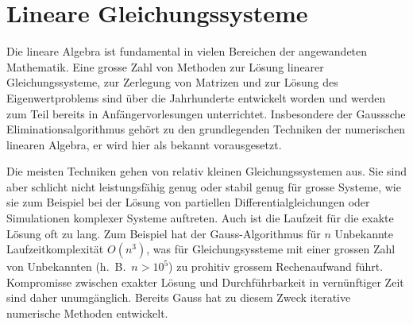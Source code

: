 %
%
%
\chapter{Lineare Gleichungssysteme\label{chapter:linsys}}
\rhead{}
Die lineare Algebra ist fundamental in vielen Bereichen der angewandeten
Mathematik.
%
Eine grosse Zahl von Methoden zur Lösung linearer
Gleichungssysteme, zur Zerlegung von Matrizen und zur Lösung des
%
%
Eigenwertproblems sind über die Jahrhunderte entwickelt worden und
werden zum Teil bereits in Anfängervorlesungen unterrichtet.
Insbesondere der Gausssche Eliminationsalgorithmus gehört zu den
grundlegenden Techniken der numerischen linearen Algebra, er wird hier
als bekannt vorausgesetzt.

Die meisten Techniken gehen von relativ kleinen Gleichungssystemen aus.
Sie sind aber schlicht nicht leistungsfähig genug oder stabil genug für 
grosse Systeme, wie sie zum Beispiel bei der Lösung von partiellen
Differentialgleichungen oder Simulationen komplexer Systeme auftreten.
Auch ist die Laufzeit für die exakte Lösung oft zu lang.
%
%
Zum Beispiel hat der Gauss-Algorithmus für $n$ Unbekannte Laufzeitkomplexität
$O(n^3)$, was für Gleichungsyssteme mit einer grossen Zahl von Unbekannten
(h.~B.~$n>10^5$) zu prohitiv grossem Rechenaufwand führt.
%
Kompromisse zwischen exakter Lösung und Durchführbarkeit in vernünftiger
Zeit sind daher unumgänglich.
Bereits Gauss hat zu diesem Zweck iterative numerische Methoden entwickelt.
%

